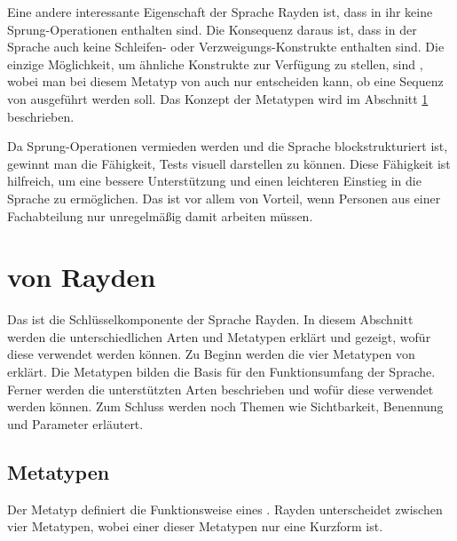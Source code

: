 \SuperPar
Eine andere interessante Eigenschaft der Sprache Rayden ist, dass in ihr keine Sprung-Operationen enthalten sind. Die Konsequenz daraus ist, dass in der Sprache auch keine Schleifen- oder Verzweigungs-Konstrukte enthalten sind. Die einzige Möglichkeit, um ähnliche Konstrukte zur Verfügung zu stellen, sind , wobei man bei diesem Metatyp von  auch nur entscheiden kann, ob eine Sequenz von  ausgeführt werden soll. Das Konzept der Metatypen wird im Abschnitt \ref{cha:Keyword} beschrieben. 

\SuperPar
Da Sprung-Operationen vermieden werden und die Sprache blockstrukturiert ist, gewinnt man die Fähigkeit, Tests visuell darstellen zu können. Diese Fähigkeit ist hilfreich, um eine bessere Unterstützung und einen leichteren Einstieg in die Sprache zu ermöglichen. Das ist vor allem von Vorteil, wenn Personen aus einer Fachabteilung nur unregelmäßig damit arbeiten müssen. 


\section{ von Rayden}
\label{cha:Keyword}

Das  ist die Schlüsselkomponente der Sprache Rayden. In diesem Abschnitt werden die unterschiedlichen Arten und Metatypen erklärt und gezeigt, wofür diese verwendet werden können. Zu Beginn werden die vier Metatypen von  erklärt. Die Metatypen bilden die Basis für den Funktionsumfang der Sprache. Ferner werden die unterstützten Arten beschrieben und wofür diese verwendet werden können. Zum Schluss werden noch Themen wie Sichtbarkeit, Benennung und Parameter erläutert.


\subsection{Metatypen}

Der Metatyp definiert die Funktionsweise eines . Rayden unterscheidet zwischen vier Metatypen, wobei einer dieser Metatypen nur eine Kurzform ist.


